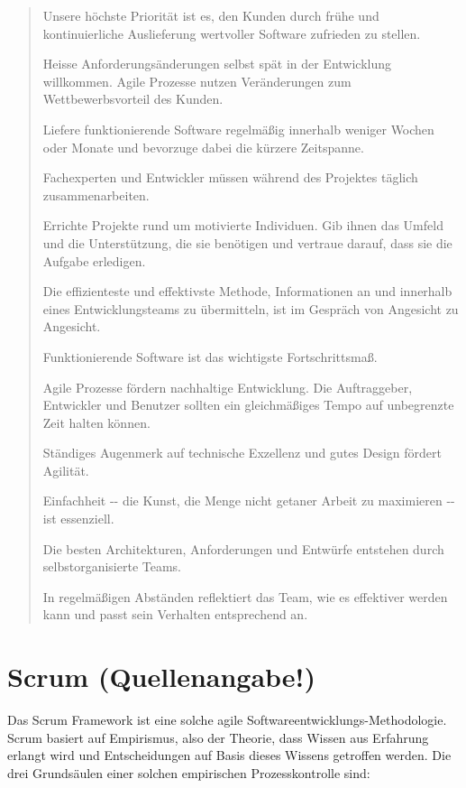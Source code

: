 \begin{quote}Unsere höchste Priorität ist es, den Kunden durch frühe und kontinuierliche Auslieferung wertvoller Software zufrieden zu stellen.

Heisse Anforderungsänderungen selbst spät in der Entwicklung willkommen. Agile Prozesse nutzen Veränderungen zum Wettbewerbsvorteil des Kunden.

Liefere funktionierende Software regelmäßig innerhalb weniger Wochen oder Monate und bevorzuge dabei die kürzere Zeitspanne.

Fachexperten und Entwickler müssen während des Projektes täglich zusammenarbeiten.

Errichte Projekte rund um motivierte Individuen. Gib ihnen das Umfeld und die Unterstützung, die sie benötigen und vertraue darauf, dass sie die Aufgabe erledigen.

Die effizienteste und effektivste Methode, Informationen an und innerhalb eines Entwicklungsteams zu übermitteln, ist im Gespräch von Angesicht zu Angesicht.

Funktionierende Software ist das wichtigste Fortschrittsmaß.

Agile Prozesse fördern nachhaltige Entwicklung. Die Auftraggeber, Entwickler und Benutzer sollten ein gleichmäßiges Tempo auf unbegrenzte Zeit halten können.

Ständiges Augenmerk auf technische Exzellenz und gutes Design fördert Agilität.

Einfachheit -\phantom{}- die Kunst, die Menge nicht getaner Arbeit zu maximieren -\phantom{}- ist essenziell.

Die besten Architekturen, Anforderungen und Entwürfe entstehen durch selbstorganisierte Teams.

In regelmäßigen Abständen reflektiert das Team, wie es effektiver werden kann und passt sein Verhalten entsprechend an.\end{quote}\cite{agile_principles}

\section{Scrum (Quellenangabe!)}

Das Scrum Framework ist eine solche agile Softwareentwicklungs-Methodologie. 
Scrum basiert auf Empirismus, also der Theorie, dass Wissen aus Erfahrung erlangt wird und Entscheidungen auf Basis dieses Wissens getroffen werden. 
Die drei Grundsäulen einer solchen empirischen Prozesskontrolle sind:

